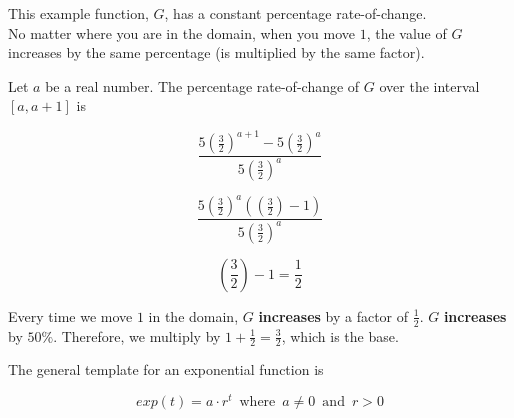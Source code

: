 \documentclass{ximera}
\begin{document}
This example function, $G$, has a constant percentage rate-of-change. \\

No matter where you are in the domain, when you move $1$, the value of $G$ increases by the same percentage (is multiplied by the same factor).


Let $a$ be a real number.  The percentage rate-of-change of $G$ over the interval $[a,a+1]$ is 



\[    \frac{5 \left(\frac{3}{2}\right)^{a+1} - 5 \left(\frac{3}{2}\right)^a}{5 \left(\frac{3}{2}\right)^a}       \]


\[   \frac{5 \left(\frac{3}{2}\right)^a (\left(\frac{3}{2}\right) - 1) }{5 \left(\frac{3}{2}\right)^a}    \]


\[   \left(\frac{3}{2}\right) - 1 = \frac{1}{2}   \]

Every time we move $1$ in the domain, $G$ \textbf{\textcolor{blue!55!black}{increases}} by a factor of $\frac{1}{2}$.  $G$ \textbf{\textcolor{blue!55!black}{increases}} by $50\%$.  Therefore, we multiply by $1 + \frac{1}{2} = \frac{3}{2}$, which is the base.





The general template for an exponential function is 

\[   exp(t) = a \cdot r^t   \, \text{ where } \,  a \ne 0  \, \text{ and } \,    r > 0   \]
\end{document}
